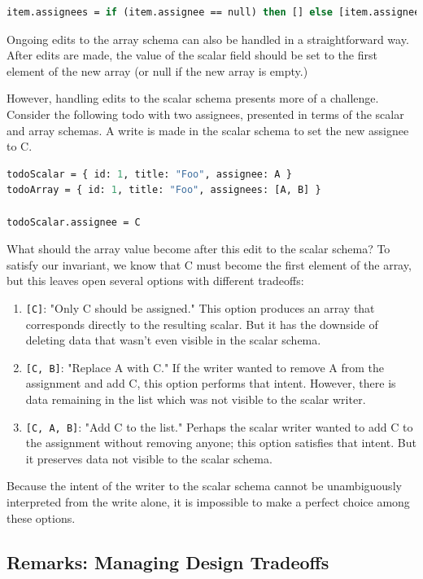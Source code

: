 \documentclass[english,submission]{programming}
\begin{document}
\begin{lstlisting}[language=ml]
item.assignees = if (item.assignee == null) then [] else [item.assignee]
\end{lstlisting}

Ongoing edits to the array schema can also be handled in a straightforward way. After edits are made, the value of the scalar field should be set to the first element of the new array (or null if the new array is empty.)

However, handling edits to the scalar schema presents more of a challenge. Consider the following todo with two assignees, presented in terms of the scalar and array schemas. A write is made in the scalar schema to set the new assignee to C.

\begin{lstlisting}[language=ml]
todoScalar = { id: 1, title: "Foo", assignee: A }
todoArray = { id: 1, title: "Foo", assignees: [A, B] }

todoScalar.assignee = C
\end{lstlisting}

What should the array value become after this edit to the scalar schema? To satisfy our invariant, we know that C must become the first element of the array, but this leaves open several options with different tradeoffs:

\begin{enumerate}
  \item \texttt{[C]}: "Only C should be assigned." This option produces an array that corresponds directly to the resulting scalar. But it has the downside of deleting data that wasn't even visible in the scalar schema.
  \item \texttt{[C, B]}: "Replace A with C." If the writer wanted to remove A from the assignment and add C, this option performs that intent. However, there is data remaining in the list which was not visible to the scalar writer.
  \item \texttt{[C, A, B]}: "Add C to the list." Perhaps the scalar writer wanted to add C to the assignment without removing anyone; this option satisfies that intent. But it preserves data not visible to the scalar schema.
\end{enumerate}

Because the intent of the writer to the scalar schema cannot be unambiguously interpreted from the write alone, it is impossible to make a perfect choice among these options.

\subsection*{Remarks: Managing Design Tradeoffs}
\end{document}

